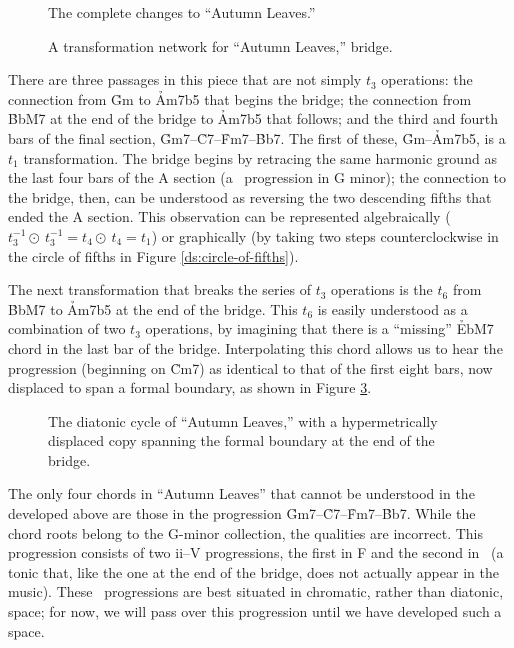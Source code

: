 \begin{figure}[h!tbp]
  \caption{The complete changes to “Autumn Leaves.”}
  \label{ds:autumn-leaves-complete}
\end{figure}

\begin{figure}[htbp]
  \vspace{\baselineskip}
  \caption{A transformation network for “Autumn Leaves,” bridge.}
  \label{ds:autumn-leaves-bridge}
\end{figure}

There are three passages in this piece that are not simply $t_3$ operations:
the connection from \h{Gm} to \h{Am7b5} that begins the bridge; the connection
from \h{BbM7} at the end of the bridge to \h{Am7b5} that follows; and the
third and fourth bars of the final section,
\h{Gm7}--\h{C7}--\h{Fm7}--\h{Bb7}. The first of these, \h{Gm}--\h{Am7b5}, is a
$t_1$ transformation. The bridge begins by retracing the same harmonic ground
as the last four bars of the A section (a \tfo\ progression in G minor); the
connection to the bridge, then, can be understood as reversing the two
descending fifths that ended the A section. This observation can be
represented algebraically ($t_3^{-1} \odot\ t_3^{-1} = t_4 \odot\ t_4 = t_1$) or
graphically (by taking two steps counterclockwise in the circle of fifths in
Figure \ref{ds:circle-of-fifths}).

The next transformation that breaks the series of $t_3$ operations is the
$t_6$ from \h{BbM7} to \h{Am7b5} at the end of the bridge. This $t_6$ is
easily understood as a combination of two $t_3$ operations, by imagining that
there is a “missing” \h{EbM7} chord in the last bar of the bridge.
Interpolating this chord allows us to hear the progression (beginning on
\h{Cm7}) as identical to that of the first eight bars, now displaced to span a
formal boundary, as shown in Figure \ref{ds:displaced-cycle}.

\begin{figure}[htbp]
  \caption{The diatonic cycle of “Autumn Leaves,” with a hypermetrically
    displaced copy spanning the formal boundary at the end of the bridge.}
  \label{ds:displaced-cycle}
\end{figure}

The only four chords in “Autumn Leaves” that cannot be understood in the
\gis{} developed above are those in the progression
\h{Gm7}--\h{C7}--\h{Fm7}--\h{Bb7}. While the chord roots belong to the G-minor
collection, the qualities are incorrect. This progression consists of two
\mbox{ii--V} progressions, the first in F and the second in
\Eflat\ (a tonic that, like the one at the end of the bridge, does not
actually appear in the music). These \tf\ progressions are best situated in
chromatic, rather than diatonic, space; for now, we will pass over this
progression until we have developed such a space.

